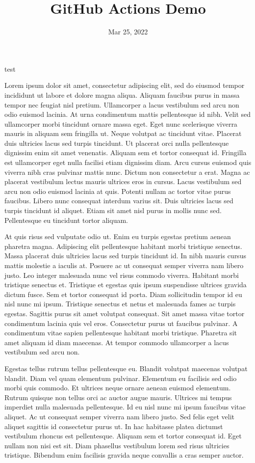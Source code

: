 \documentclass{article}
\title{GitHub Actions Demo}
\author{}
\date{Mar 25, 2022}
\begin{document}
\maketitle

test

Lorem ipsum dolor sit amet, consectetur adipiscing elit, sed do eiusmod tempor incididunt ut labore et dolore magna aliqua. Aliquam faucibus purus in massa tempor nec feugiat nisl pretium. Ullamcorper a lacus vestibulum sed arcu non odio euismod lacinia. At urna condimentum mattis pellentesque id nibh. Velit sed ullamcorper morbi tincidunt ornare massa eget. Eget nunc scelerisque viverra mauris in aliquam sem fringilla ut. Neque volutpat ac tincidunt vitae. Placerat duis ultricies lacus sed turpis tincidunt. Ut placerat orci nulla pellentesque dignissim enim sit amet venenatis. Aliquam sem et tortor consequat id. Fringilla est ullamcorper eget nulla facilisi etiam dignissim diam. Arcu cursus euismod quis viverra nibh cras pulvinar mattis nunc. Dictum non consectetur a erat. Magna ac placerat vestibulum lectus mauris ultrices eros in cursus. Lacus vestibulum sed arcu non odio euismod lacinia at quis. Potenti nullam ac tortor vitae purus faucibus. Libero nunc consequat interdum varius sit. Duis ultricies lacus sed turpis tincidunt id aliquet. Etiam sit amet nisl purus in mollis nunc sed. Pellentesque eu tincidunt tortor aliquam.


At quis risus sed vulputate odio ut. Enim eu turpis egestas pretium aenean pharetra magna. Adipiscing elit pellentesque habitant morbi tristique senectus. Massa placerat duis ultricies lacus sed turpis tincidunt id. In nibh mauris cursus mattis molestie a iaculis at. Posuere ac ut consequat semper viverra nam libero justo. Leo integer malesuada nunc vel risus commodo viverra. Habitant morbi tristique senectus et. Tristique et egestas quis ipsum suspendisse ultrices gravida dictum fusce. Sem et tortor consequat id porta. Diam sollicitudin tempor id eu nisl nunc mi ipsum. Tristique senectus et netus et malesuada fames ac turpis egestas. Sagittis purus sit amet volutpat consequat. Sit amet massa vitae tortor condimentum lacinia quis vel eros. Consectetur purus ut faucibus pulvinar. A condimentum vitae sapien pellentesque habitant morbi tristique. Pharetra sit amet aliquam id diam maecenas. At tempor commodo ullamcorper a lacus vestibulum sed arcu non.

Egestas tellus rutrum tellus pellentesque eu. Blandit volutpat maecenas volutpat blandit. Diam vel quam elementum pulvinar. Elementum eu facilisis sed odio morbi quis commodo. Et ultrices neque ornare aenean euismod elementum. Rutrum quisque non tellus orci ac auctor augue mauris. Ultrices mi tempus imperdiet nulla malesuada pellentesque. Id eu nisl nunc mi ipsum faucibus vitae aliquet. Ac ut consequat semper viverra nam libero justo. Sed felis eget velit aliquet sagittis id consectetur purus ut. In hac habitasse platea dictumst vestibulum rhoncus est pellentesque. Aliquam sem et tortor consequat id. Eget nullam non nisi est sit. Diam phasellus vestibulum lorem sed risus ultricies tristique. Bibendum enim facilisis gravida neque convallis a cras semper auctor.
\end{document}

